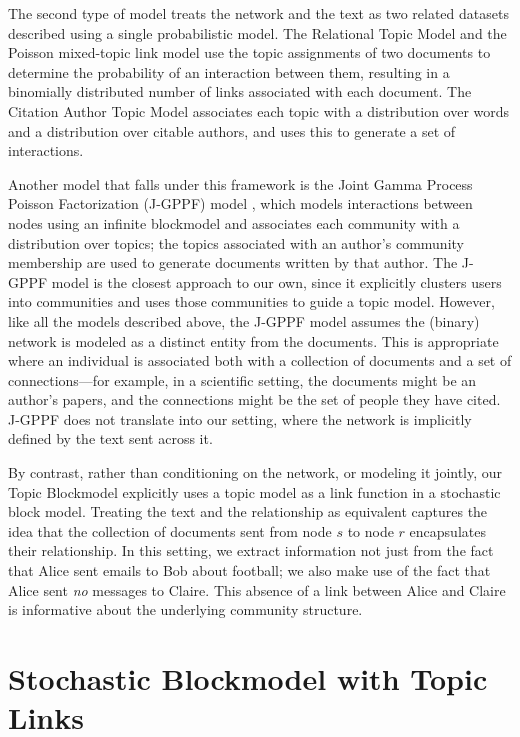         The second type of model treats the network and the text as two related datasets described using a single probabilistic model.
        The Relational Topic Model \citep{rtm} and the Poisson mixed-topic link model \citep{Zhu:Yan:Getoor:Moore:2013} use the topic assignments of two documents to determine the probability of an interaction between them, resulting in a binomially distributed number of links associated with each document. The Citation Author Topic Model \citep{tu2010} associates each topic with a distribution over words and a distribution over citable authors, and uses this to generate a set of interactions.
        
        Another model that falls under this framework is the Joint Gamma Process Poisson Factorization (J-GPPF) model \citep{acharya2015}, which models interactions between nodes using an infinite blockmodel and associates each community with a distribution over topics; the topics associated with an author's community membership are used to generate documents written by that author. The J-GPPF model is the closest approach to our own, since it explicitly clusters users into communities and uses those communities to guide a topic model. However, like all the models described above, the J-GPPF model assumes the (binary) network is modeled as a distinct entity from the documents. This is appropriate where an individual is associated both with a collection of documents and a set of connections---for example, in a scientific setting, the documents might be an author's papers, and the connections might be the set of people they have cited. J-GPPF does not translate into our setting, where the network is implicitly defined by the text sent across it.
    
        By contrast, rather than conditioning on the network, or modeling it jointly, our Topic Blockmodel explicitly uses a topic model as a link function in a stochastic block model.  Treating the text and the relationship as equivalent captures the idea that the collection of documents sent from node $s$ to node $r$ encapsulates their relationship. In this setting, we extract information not just from the fact that Alice sent emails to Bob about football; we also make use of the fact that Alice sent \textit{no} messages to Claire. This absence of a link between Alice and Claire is informative about the underlying community structure.

\section{Stochastic Blockmodel with Topic Links}\label{sec:model}
    
